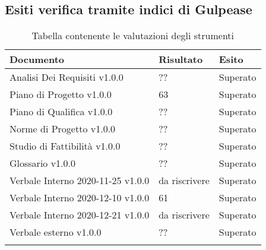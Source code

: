 \documentclass[../piano_di_qualifica.tex]{subfiles}
\begin{document}
\subsection{Esiti verifica tramite indici di Gulpease}
\label{sub:verif_gul}

\begin{center}
	\begin{longtable}{|p{4.5cm}|p{2.5cm}|p{3cm}|}
		\hline
		\rowcolor{lightgray}
            \textbf{Documento} & \textbf{Risultato} &  \textbf{Esito} \\
            \hline 
            Analisi Dei Requisiti v1.0.0 & ?? & Superato \\
            \hline
            \hline 
            Piano di Progetto v1.0.0 & 63 & Superato \\
            \hline 
            Piano di Qualifica v1.0.0 & ?? & Superato \\
            \hline 
            Norme di Progetto v1.0.0 & ?? & Superato \\
            \hline 
            Studio di Fattibilità v1.0.0 & ?? & Superato \\
            \hline 
            Glossario v1.0.0 & ?? & Superato \\
            \hline 
            Verbale Interno 2020-11-25 v1.0.0 & da riscrivere & Superato \\
            \hline 
            Verbale Interno 2020-12-10 v1.0.0 & 61 & Superato \\
            \hline 
            Verbale Interno 2020-12-21 v1.0.0 & da riscrivere & Superato \\
            \hline 
            Verbale esterno v1.0.0 & ?? & Superato \\
            \hline
            \hline

\caption{Tabella contenente le valutazioni degli strumenti}
\end{longtable}
\end{center}
\end{document}
